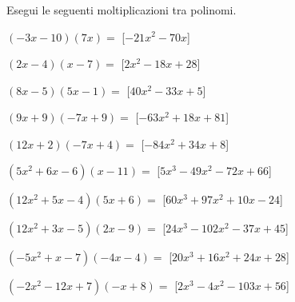 \subsubsection*{}

\begin{esercizio}
\label{ese:10.20}
Esegui le seguenti moltiplicazioni tra polinomi.
\begin{enumeratea}
\item \(\left(- 3 x - 10\right)\left(7 x\right)=\)
  \hfill [\(- 21 x^{2} - 70 x\)]
\item \(\left(2 x - 4\right)\left(x - 7\right)=\)
  \hfill [\(2 x^{2} - 18 x + 28\)]
\item \(\left(8 x - 5\right)\left(5 x - 1\right)=\)
  \hfill [\(40 x^{2} - 33 x + 5\)]
\item \(\left(9 x + 9\right)\left(- 7 x + 9\right)=\)
  \hfill [\(- 63 x^{2} + 18 x + 81\)]
\item \(\left(12 x + 2\right)\left(- 7 x + 4\right)=\)
  \hfill [\(- 84 x^{2} + 34 x + 8\)]
\item \(\left(5 x^{2} + 6 x - 6\right)\left(x - 11\right)=\)
  \hfill [\(5 x^{3} - 49 x^{2} - 72 x + 66\)]
\item \(\left(12 x^{2} + 5 x - 4\right)\left(5 x + 6\right)=\)
  \hfill [\(60 x^{3} + 97 x^{2} + 10 x - 24\)]
\item \(\left(12 x^{2} + 3 x - 5\right)\left(2 x - 9\right)=\)
  \hfill [\(24 x^{3} - 102 x^{2} - 37 x + 45\)]
\item \(\left(- 5 x^{2} + x - 7\right)\left(- 4 x - 4\right)=\)
  \hfill [\(20 x^{3} + 16 x^{2} + 24 x + 28\)]
\item \(\left(- 2 x^{2} - 12 x + 7\right)\left(- x + 8\right)=\)
  \hfill [\(2 x^{3} - 4 x^{2} - 103 x + 56\)]

\end{enumeratea}
\end{esercizio}
